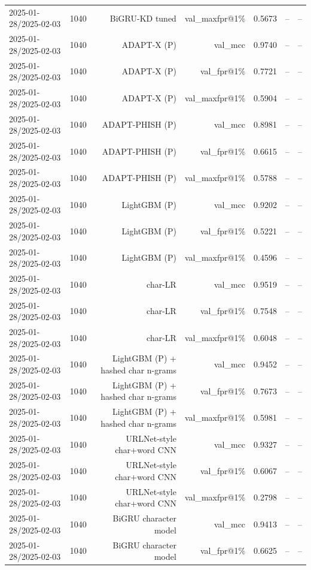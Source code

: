 \begin{table}[t]
\begin{tabular}{llrrrrr}
2025-01-28/2025-02-03 & 1040 & BiGRU-KD tuned & val\_maxfpr@1\% & 0.5673 & -- & -- \\
2025-01-28/2025-02-03 & 1040 & ADAPT-X (P) & val\_mcc & 0.9740 & -- & -- \\
2025-01-28/2025-02-03 & 1040 & ADAPT-X (P) & val\_fpr@1\% & 0.7721 & -- & -- \\
2025-01-28/2025-02-03 & 1040 & ADAPT-X (P) & val\_maxfpr@1\% & 0.5904 & -- & -- \\
2025-01-28/2025-02-03 & 1040 & ADAPT-PHISH (P) & val\_mcc & 0.8981 & -- & -- \\
2025-01-28/2025-02-03 & 1040 & ADAPT-PHISH (P) & val\_fpr@1\% & 0.6615 & -- & -- \\
2025-01-28/2025-02-03 & 1040 & ADAPT-PHISH (P) & val\_maxfpr@1\% & 0.5788 & -- & -- \\
2025-01-28/2025-02-03 & 1040 & LightGBM (P) & val\_mcc & 0.9202 & -- & -- \\
2025-01-28/2025-02-03 & 1040 & LightGBM (P) & val\_fpr@1\% & 0.5221 & -- & -- \\
2025-01-28/2025-02-03 & 1040 & LightGBM (P) & val\_maxfpr@1\% & 0.4596 & -- & -- \\
2025-01-28/2025-02-03 & 1040 & char-LR & val\_mcc & 0.9519 & -- & -- \\
2025-01-28/2025-02-03 & 1040 & char-LR & val\_fpr@1\% & 0.7548 & -- & -- \\
2025-01-28/2025-02-03 & 1040 & char-LR & val\_maxfpr@1\% & 0.6048 & -- & -- \\
2025-01-28/2025-02-03 & 1040 & LightGBM (P) + hashed char n-grams & val\_mcc & 0.9452 & -- & -- \\
2025-01-28/2025-02-03 & 1040 & LightGBM (P) + hashed char n-grams & val\_fpr@1\% & 0.7673 & -- & -- \\
2025-01-28/2025-02-03 & 1040 & LightGBM (P) + hashed char n-grams & val\_maxfpr@1\% & 0.5981 & -- & -- \\
2025-01-28/2025-02-03 & 1040 & URLNet-style char+word CNN & val\_mcc & 0.9327 & -- & -- \\
2025-01-28/2025-02-03 & 1040 & URLNet-style char+word CNN & val\_fpr@1\% & 0.6067 & -- & -- \\
2025-01-28/2025-02-03 & 1040 & URLNet-style char+word CNN & val\_maxfpr@1\% & 0.2798 & -- & -- \\
2025-01-28/2025-02-03 & 1040 & BiGRU character model & val\_mcc & 0.9413 & -- & -- \\
2025-01-28/2025-02-03 & 1040 & BiGRU character model & val\_fpr@1\% & 0.6625 & -- & -- \\

\end{tabular}
\end{table}
